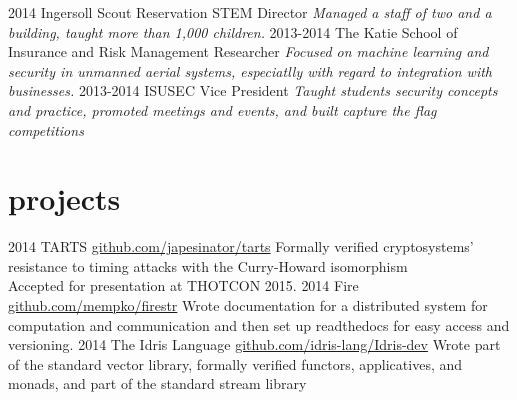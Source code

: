 \documentclass[]{friggeri-cv}
\begin{document}
\begin{entrylist}
  \entry
    {2014}
    {Ingersoll Scout Reservation}
    {STEM Director}
    {\emph{Managed a staff of two and a building, taught more than 1,000 children.}}
  \entry
    {2013-2014}
    {The Katie School of Insurance and Risk Management}
    {Researcher}
    {\emph{Focused on machine learning and security in unmanned aerial systems, especiatlly with regard to integration with businesses.}}
  \entry
    {2013-2014}
    {ISUSEC}
    {Vice President}
    {\emph{Taught students security concepts and practice, promoted meetings and events, and built capture the flag competitions}}
\end{entrylist}

\section{projects}

\begin{entrylist}
  \entry
    {2014}
    {TARTS}
    {\href{https://github.com/japesinator/tarts}{github.com/japesinator/tarts}}
    {Formally verified cryptosystems' resistance to timing attacks with the Curry-Howard isomorphism \\
    Accepted for presentation at THOTCON 2015.}
  \entry
    {2014}
    {Fire\star}
    {\href{https://github.com/mempko/firestr}{github.com/mempko/firestr}}
    {Wrote documentation for a distributed system for computation and communication and then set up readthedocs for easy access and versioning.}
  \entry
    {2014}
    {The Idris Language}
    {\href{https://github.com/idris-lang/Idris-dev}{github.com/idris-lang/Idris-dev}}
    {Wrote part of the standard vector library, formally verified functors, applicatives, and monads, and part of the standard stream library}
\end{entrylist}
\end{document}
